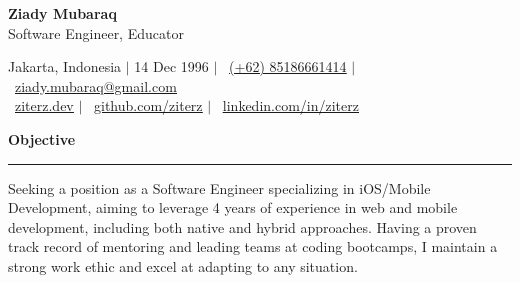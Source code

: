 \documentclass{article}
\newcommand{\header}[1]{
	\vspace{4mm}
	{\large \noindent \textbf{#1}}
	\vspace{1mm}
	\hrule
	\vspace{2mm}
}
\begin{document}
	\begin{flushleft}
		{\LARGE \textbf{Ziady Mubaraq}} \\
		{\large Software Engineer, Educator}

		\vspace{1mm}
		
		Jakarta, Indonesia  $\mid$ 14 Dec 1996 $\mid$ \faWhatsapp ~\href{https://wa.me/6285186661414}{\underline{(+62) 85186661414}} $\mid$ \faEnvelope ~\href{mailto:ziady.mubaraq@gmail.com}{\underline{ziady.mubaraq@gmail.com}} \\
		\faGlobe ~\href{https://ziterz.dev}{\underline{ziterz.dev}}  $\mid$ \faGithub ~\href{https://github.com/ziterz}{\underline{github.com/ziterz}} $\mid$ \faLinkedin ~\href{https://linkedin.com/in/ziterz}{\underline{linkedin.com/in/ziterz}}
	\end{flushleft}

	\vspace{-3mm}

	\header{Objective}
		Seeking a position as a Software Engineer specializing in iOS/Mobile Development, aiming to leverage 4 years of experience in web and mobile development, including both native and hybrid approaches. Having a proven track record of mentoring and leading teams at coding bootcamps, I maintain a strong work ethic and excel at adapting to any situation.
		\vspace{1mm}

	\setlength{\columnsep}{1.5em}
\end{document}
